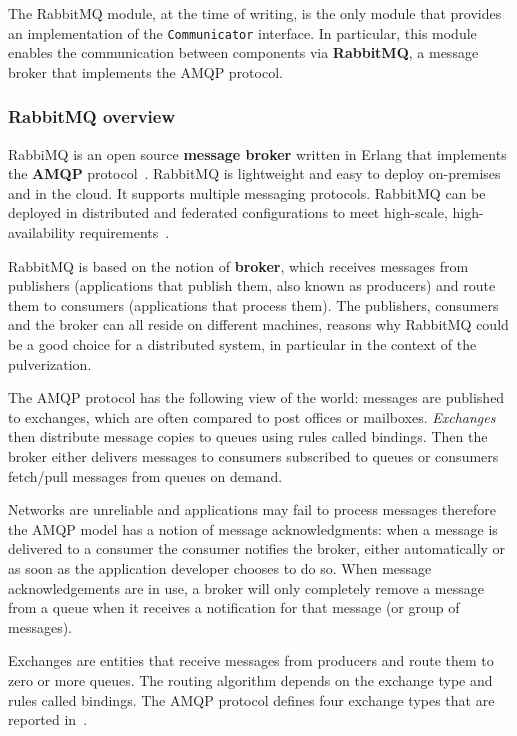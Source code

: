 The RabbitMQ module, at the time of writing, is the only module that provides an implementation of the \texttt{Communicator} interface.
In particular, this module enables the communication between components via \textbf{RabbitMQ}, a message broker that implements the AMQP protocol.

\subsubsection{RabbitMQ overview}

RabbiMQ is an open source \textbf{message broker} written in Erlang that implements the \textbf{AMQP} protocol~\cite{4012603}.
RabbitMQ is lightweight and easy to deploy on-premises and in the cloud. It supports multiple messaging protocols. RabbitMQ can be deployed in
distributed and federated configurations to meet high-scale, high-availability requirements~\cite{rabbitmq}.

RabbitMQ is based on the notion of \textbf{broker}, which receives messages from publishers (applications that publish them, also known as producers)
and route them to consumers (applications that process them). The publishers, consumers and the broker can all reside on different machines,
reasons why RabbitMQ could be a good choice for a distributed system, in particular in the context of the pulverization.

The AMQP protocol has the following view of the world: messages are published to exchanges, which are often compared to post offices or mailboxes.
\emph{Exchanges} then distribute message copies to queues using rules called bindings. Then the broker either delivers messages to consumers
subscribed to queues or consumers fetch/pull messages from queues on demand.

Networks are unreliable and applications may fail to process messages therefore the AMQP model has a notion of message acknowledgments: when a
message is delivered to a consumer the consumer notifies the broker, either automatically or as soon as the application developer chooses to do so.
When message acknowledgements are in use, a broker will only completely remove a message from a queue when it receives a notification for that
message (or group of messages).

Exchanges are entities that receive messages from producers and route them to zero or more queues. The routing algorithm depends on the exchange
type and rules called bindings. The AMQP protocol defines four exchange types that are reported in~.

